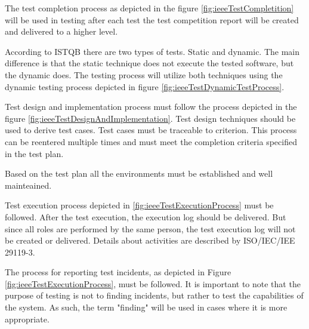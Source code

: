 The test completion process as depicted in the figure \ref{fig:ieeeTestCompletition} will be used in testing after each test the test competition report will be created and delivered to a higher level.


According to ISTQB \cite{FoundationOfSoftwareTesting} there are two types of tests. Static and dynamic. The main difference is that the static technique does not execute the tested software, but the dynamic does. The testing process will utilize both techniques using the dynamic testing process depicted in figure \ref{fig:ieeeTestDynamicTestProcess}.


Test design and implementation process must follow the process depicted in the figure \ref{fig:ieeeTestDesignAndImplementation}. Test design techniques should be used to derive test cases. Test cases must be traceable to criterion. This process can be reentered multiple times and must meet the completion criteria specified in the test plan.


Based on the test plan all the environments must be established and well mainteained.

Test execution process depicted in \ref{fig:ieeeTestExecutionProcess} must be followed. After the test execution, the execution log should be delivered. But since all roles are performed by the same person, the test execution log will not be created or delivered.
Details about activities are described by ISO/IEC/IEE 29119-3.


The process for reporting test incidents, as depicted in Figure \ref{fig:ieeeTestExecutionProcess}, must be followed. It is important to note that the purpose of testing is not to finding incidents, but rather to test the capabilities of the system. As such, the term "finding" will be used in cases where it is more appropriate.

